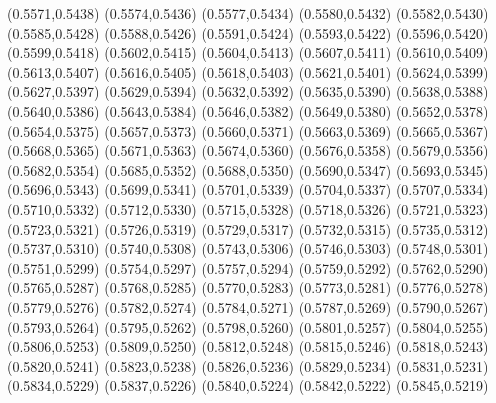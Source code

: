 \PST@Cross(0.5571,0.5438)
\PST@Cross(0.5574,0.5436)
\PST@Cross(0.5577,0.5434)
\PST@Cross(0.5580,0.5432)
\PST@Cross(0.5582,0.5430)
\PST@Cross(0.5585,0.5428)
\PST@Cross(0.5588,0.5426)
\PST@Cross(0.5591,0.5424)
\PST@Cross(0.5593,0.5422)
\PST@Cross(0.5596,0.5420)
\PST@Cross(0.5599,0.5418)
\PST@Cross(0.5602,0.5415)
\PST@Cross(0.5604,0.5413)
\PST@Cross(0.5607,0.5411)
\PST@Cross(0.5610,0.5409)
\PST@Cross(0.5613,0.5407)
\PST@Cross(0.5616,0.5405)
\PST@Cross(0.5618,0.5403)
\PST@Cross(0.5621,0.5401)
\PST@Cross(0.5624,0.5399)
\PST@Cross(0.5627,0.5397)
\PST@Cross(0.5629,0.5394)
\PST@Cross(0.5632,0.5392)
\PST@Cross(0.5635,0.5390)
\PST@Cross(0.5638,0.5388)
\PST@Cross(0.5640,0.5386)
\PST@Cross(0.5643,0.5384)
\PST@Cross(0.5646,0.5382)
\PST@Cross(0.5649,0.5380)
\PST@Cross(0.5652,0.5378)
\PST@Cross(0.5654,0.5375)
\PST@Cross(0.5657,0.5373)
\PST@Cross(0.5660,0.5371)
\PST@Cross(0.5663,0.5369)
\PST@Cross(0.5665,0.5367)
\PST@Cross(0.5668,0.5365)
\PST@Cross(0.5671,0.5363)
\PST@Cross(0.5674,0.5360)
\PST@Cross(0.5676,0.5358)
\PST@Cross(0.5679,0.5356)
\PST@Cross(0.5682,0.5354)
\PST@Cross(0.5685,0.5352)
\PST@Cross(0.5688,0.5350)
\PST@Cross(0.5690,0.5347)
\PST@Cross(0.5693,0.5345)
\PST@Cross(0.5696,0.5343)
\PST@Cross(0.5699,0.5341)
\PST@Cross(0.5701,0.5339)
\PST@Cross(0.5704,0.5337)
\PST@Cross(0.5707,0.5334)
\PST@Cross(0.5710,0.5332)
\PST@Cross(0.5712,0.5330)
\PST@Cross(0.5715,0.5328)
\PST@Cross(0.5718,0.5326)
\PST@Cross(0.5721,0.5323)
\PST@Cross(0.5723,0.5321)
\PST@Cross(0.5726,0.5319)
\PST@Cross(0.5729,0.5317)
\PST@Cross(0.5732,0.5315)
\PST@Cross(0.5735,0.5312)
\PST@Cross(0.5737,0.5310)
\PST@Cross(0.5740,0.5308)
\PST@Cross(0.5743,0.5306)
\PST@Cross(0.5746,0.5303)
\PST@Cross(0.5748,0.5301)
\PST@Cross(0.5751,0.5299)
\PST@Cross(0.5754,0.5297)
\PST@Cross(0.5757,0.5294)
\PST@Cross(0.5759,0.5292)
\PST@Cross(0.5762,0.5290)
\PST@Cross(0.5765,0.5287)
\PST@Cross(0.5768,0.5285)
\PST@Cross(0.5770,0.5283)
\PST@Cross(0.5773,0.5281)
\PST@Cross(0.5776,0.5278)
\PST@Cross(0.5779,0.5276)
\PST@Cross(0.5782,0.5274)
\PST@Cross(0.5784,0.5271)
\PST@Cross(0.5787,0.5269)
\PST@Cross(0.5790,0.5267)
\PST@Cross(0.5793,0.5264)
\PST@Cross(0.5795,0.5262)
\PST@Cross(0.5798,0.5260)
\PST@Cross(0.5801,0.5257)
\PST@Cross(0.5804,0.5255)
\PST@Cross(0.5806,0.5253)
\PST@Cross(0.5809,0.5250)
\PST@Cross(0.5812,0.5248)
\PST@Cross(0.5815,0.5246)
\PST@Cross(0.5818,0.5243)
\PST@Cross(0.5820,0.5241)
\PST@Cross(0.5823,0.5238)
\PST@Cross(0.5826,0.5236)
\PST@Cross(0.5829,0.5234)
\PST@Cross(0.5831,0.5231)
\PST@Cross(0.5834,0.5229)
\PST@Cross(0.5837,0.5226)
\PST@Cross(0.5840,0.5224)
\PST@Cross(0.5842,0.5222)
\PST@Cross(0.5845,0.5219)
